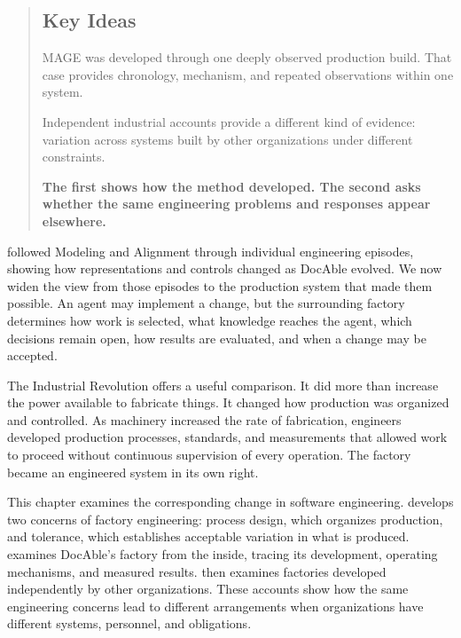 



\begin{quote}
\mbox{}%
\subsection{Key Ideas}\label{heading:depth-and-breadth}

MAGE was developed through one deeply observed production build. That case provides chronology, mechanism, and repeated observations within one system.

Independent industrial accounts provide a different kind of evidence: variation across systems built by other organizations under different constraints.

\textbf{The first shows how the method developed. The second asks whether the same engineering problems and responses appear elsewhere.}
\end{quote}

 followed Modeling and Alignment through individual engineering episodes, showing how representations and controls changed as DocAble evolved. We now widen the view from those episodes to the production system that made them possible. An agent may implement a change, but the surrounding factory determines how work is selected, what knowledge reaches the agent, which decisions remain open, how results are evaluated, and when a change may be accepted.

The Industrial Revolution offers a useful comparison. It did more than increase the power available to fabricate things. It changed how production was organized and controlled. As machinery increased the rate of fabrication, engineers developed production processes, standards, and measurements that allowed work to proceed without continuous supervision of every operation. The factory became an engineered system in its own right.

This chapter examines the corresponding change in software engineering.  develops two concerns of factory engineering: process design, which organizes production, and tolerance, which establishes acceptable variation in what is produced.  examines DocAble's factory from the inside, tracing its development, operating mechanisms, and measured results.  then examines factories developed independently by other organizations. These accounts show how the same engineering concerns lead to different arrangements when organizations have different systems, personnel, and obligations.
